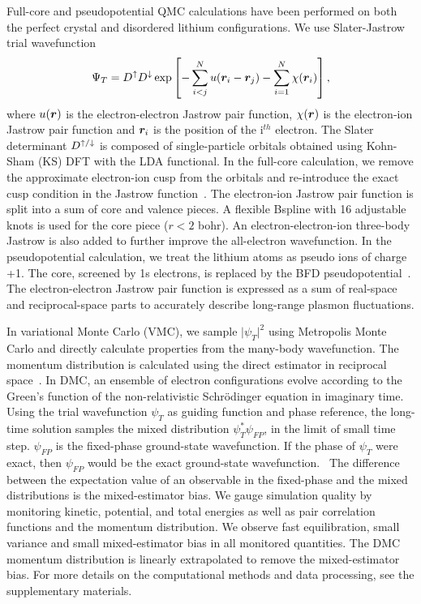 Full-core and pseudopotential QMC calculations have been performed on both  the perfect crystal and disordered lithium configurations. We use Slater-Jastrow trial wavefunction
\begin{equation}
\Psi_T = D^{\uparrow} D^{\downarrow} \exp\left[ -\sum\limits_{i<j}^{N} u(\boldsymbol{r}_i-\boldsymbol{r}_j) - \sum\limits_{i=1}^N \chi(\boldsymbol{r}_i) \right],\label{eq:sj}
\end{equation}
where $u(\boldsymbol{r})$ is the electron-electron Jastrow pair function, $\chi(\boldsymbol{r})$ is the electron-ion Jastrow pair function and $\boldsymbol{r}_i$ is the position of the i$^{th}$ electron. The Slater determinant $D^{\uparrow/\downarrow}$ is composed of single-particle orbitals obtained using Kohn-Sham (KS) DFT with the LDA functional. In the full-core calculation, we remove the approximate electron-ion cusp from the orbitals and re-introduce the exact cusp condition in the Jastrow function~\cite{Ceperley1981}. The electron-ion Jastrow pair function is split into a sum of core and valence pieces. A flexible Bspline with 16 adjustable knots is used for the core piece ($r<2$ bohr). An electron-electron-ion three-body Jastrow is also added to further improve the all-electron wavefunction. In the pseudopotential calculation, we treat the lithium atoms as pseudo ions of charge +1. The core, screened by 1s electrons, is replaced by the BFD pseudopotential~\cite{Burkatzki2007}.  The electron-electron Jastrow pair function is expressed as a sum of real-space and reciprocal-space parts to accurately describe long-range plasmon fluctuations.

In variational Monte Carlo (VMC), we sample $\vert \psi_T \vert^2$ using Metropolis Monte Carlo and directly calculate properties from the many-body wavefunction. The momentum distribution is calculated using the direct estimator in reciprocal space~\cite{McMillan1965}. In DMC, an ensemble of electron configurations evolve according to the Green's function of the non-relativistic Schr\"odinger equation in imaginary time. Using the trial wavefunction $\psi_T$ as guiding function and phase reference, the long-time solution samples the mixed distribution $\psi^*_T\psi_{FP}$, in the limit of small time step. $\psi_{FP}$ is the fixed-phase ground-state wavefunction. If the phase of $\psi_T$ were exact, then $\psi_{FP}$ would be the exact ground-state wavefunction.~\cite{Ortiz1993} The difference between the expectation value of an observable in the fixed-phase and the mixed distributions is the mixed-estimator bias. We gauge simulation quality by monitoring kinetic, potential, and total energies as well as pair correlation functions and the momentum distribution. We observe fast equilibration, small variance and small mixed-estimator bias in all monitored quantities. The DMC momentum distribution is linearly extrapolated to remove the mixed-estimator bias. For more details on the computational methods and data processing, see the supplementary materials.

